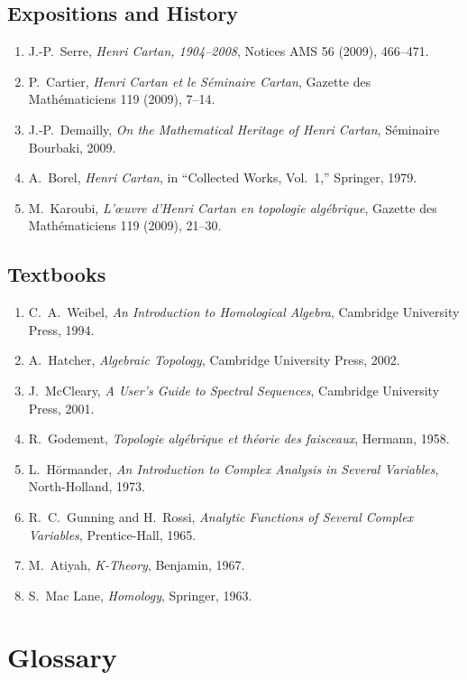 \subsection*{Expositions and History}
\begin{enumerate}
    \item J.-P.\ Serre, \textit{Henri Cartan, 1904--2008}, Notices AMS 56 (2009), 466--471.
    \item P.\ Cartier, \textit{Henri Cartan et le S{\'e}minaire Cartan}, Gazette des Math{\'e}maticiens 119 (2009), 7--14.
    \item J.-P.\ Demailly, \textit{On the Mathematical Heritage of Henri Cartan}, S{\'e}minaire Bourbaki, 2009.
    \item A.\ Borel, \textit{Henri Cartan}, in ``Collected Works, Vol.\ 1,'' Springer, 1979.
    \item M.\ Karoubi, \textit{L'{\oe}uvre d'Henri Cartan en topologie alg{\'e}brique}, Gazette des Math{\'e}maticiens 119 (2009), 21--30.
\end{enumerate}

\subsection*{Textbooks}
\begin{enumerate}
    \item C.\ A.\ Weibel, \textit{An Introduction to Homological Algebra}, Cambridge University Press, 1994.
    \item A.\ Hatcher, \textit{Algebraic Topology}, Cambridge University Press, 2002.
    \item J.\ McCleary, \textit{A User's Guide to Spectral Sequences}, Cambridge University Press, 2001.
    \item R.\ Godement, \textit{Topologie alg{\'e}brique et th{\'e}orie des faisceaux}, Hermann, 1958.
    \item L.\ H\"{o}rmander, \textit{An Introduction to Complex Analysis in Several Variables}, North-Holland, 1973.
    \item R.\ C.\ Gunning and H.\ Rossi, \textit{Analytic Functions of Several Complex Variables}, Prentice-Hall, 1965.
    \item M.\ Atiyah, \textit{K-Theory}, Benjamin, 1967.
    \item S.\ Mac Lane, \textit{Homology}, Springer, 1963.
\end{enumerate}

\section*{Glossary}

